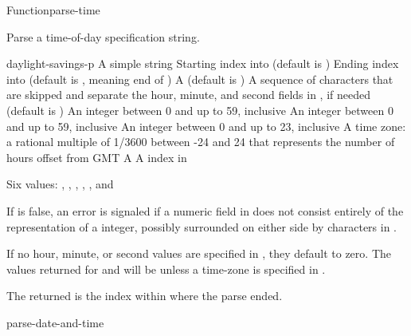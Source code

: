 \documentclass[10pt,twoside,english,pdftex]{article}
\begin{document}
\begin{functiondoc}{Function}{parse-time}{%
    }
% 

\fnsyntax

\fnpurpose Parse a time-of-day specification string.

\fnpackage {} 

\fnmodule {}

\fnargs
\begin{args}{daylight-savings-p}
\arg[string] A simple string
\arg[start] Starting index into  (default is )
\arg[end] Ending index into  (default is \nil, meaning
end of )
 A  (default is \nil)
\arg[separators] A sequence of characters that are skipped and separate the
 hour, minute, and second fields in , if needed (default is 
 )
\arg[second] An integer between 0 and up to 59, inclusive
\arg[minute] An integer between 0 and up to 59, inclusive
\arg[hour] An integer between 0 and up to 23, inclusive
 A time zone: a rational multiple of 1/3600 between
 -24 and 24 that represents the number of hours offset from GMT
 A 
\arg[position] A index in 
\end{args}

\fnreturns Six values: , , ,
, , and

\fnerrors
%
If  is false, an error is signaled if a numeric field in
 does not consist entirely of the representation of a integer,
possibly surrounded on either side by characters in .

\fndescription
%
If no hour, minute, or second values are specified in , they
default to zero.  The values returned for  and
 will be \nil{} unless a time-zone is specified
in .

The returned  is the index within  where the
parse ended.

\begin{alsos}{parse-date-and-time}
\end{alsos}


\end{functiondoc}
\end{document}
